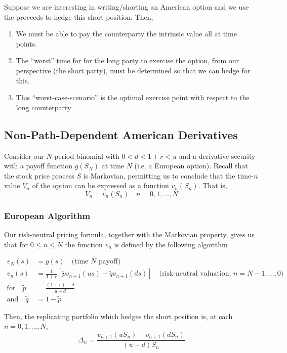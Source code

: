 \documentclass[12pt]{article}
\newlength\tindent
\renewcommand{\indent}{\hspace*{\tindent}}
\begin{document}
\indent Suppose we are interesting in writing/shorting an American option and we use the proceeds to hedge this short position. Then,
\begin{enumerate}
	\item We must be able to pay the counterparty the intrinsic value all at time points.
	\item The ``worst'' time for for the long party to exercise the option, from our perspective (the short party), must be determined so that we can hedge for this.
	\item This ``worst-case-scenario'' is the optimal exercise point with respect to the long counterparty
\end{enumerate}

\subsection{Non-Path-Dependent American Derivatives}

\indent Consider our $N$-period binomial with $0 < d < 1 + r < u$ and a derivative security with a payoff function $g(S_N)$ at time $N$ (i.e. a European option). Recall that the stock price process $S$ is Markovian, permitting us to conclude that the time-$n$ value $V_n$ of the option can be expressed as a function $v_n(S_n)$. That is,
\begin{equation*}
	V_n = v_n(S_n) \quad n = 0,1,...,N
\end{equation*}

\subsubsection{European Algorithm}

\indent Our risk-neutral pricing formula, together with the Markovian property, gives us that for $0 \leq n \leq N$ the function $v_n$ is defined by the following algorithm

\begin{align*}
	v_N(s) &= g(s) \quad \text{(time $N$ payoff)} \\
	v_n(s) &= \frac{1}{1 + r}[\tilde{p} v_{n + 1}(us) + \tilde{q}v_{n + 1}(ds)] \quad \text{(risk-neutral valuation, $n = N-1,...,0$)} \\
	\text{for} \quad \tilde{p} &= \frac{(1 + r) - d}{u - d} \\
	\text{and} \quad \tilde{q} &= 1 - \tilde{p}
\end{align*}

Then, the replicating portfolio which hedges the short position is, at each $n = 0,1,...,N$,
\begin{equation*}
	\Delta_n = \frac{ v_{n + 1}(uS_n) - v_{n + 1}(dS_n) }{ (u - d)S_n }
\end{equation*}
\end{document}
